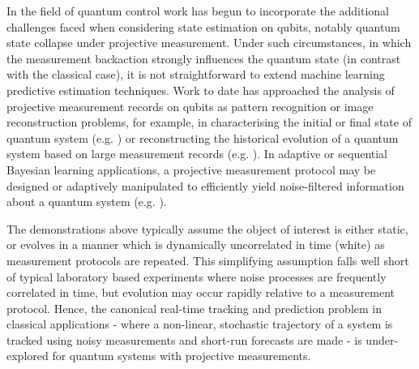 In the field of quantum control work has begun to incorporate the additional challenges faced when considering state estimation on qubits, notably quantum state collapse under projective measurement.  Under such circumstances, in which the measurement backaction strongly influences the quantum state (in contrast with the classical case), it is not straightforward to extend machine learning predictive estimation techniques.  Work to date has approached the analysis of projective measurement records on qubits as pattern recognition or image reconstruction problems, for example, in characterising the initial or final state of quantum system (e.g. \cite{struchalin2016experimental, sergeevich2011characterization, mahler2013adaptive}) or reconstructing the historical evolution of a quantum system based on large measurement records (e.g. \cite{stenberg2016characterization, shabani2011efficient, shen2014reconstructing, de2016estimation, tan2015prediction, huang2017neural}). In adaptive or sequential Bayesian learning applications, a projective measurement protocol may be designed or adaptively manipulated to efficiently yield noise-filtered information about a quantum system (e.g. \cite{bonato2016optimized, wiebe2015bayesian}). 

The demonstrations above typically assume the object of interest is either static, or evolves in a manner which is dynamically uncorrelated in time (white) as measurement protocols are repeated. This simplifying assumption falls well short of typical laboratory based experiments where noise processes are frequently correlated in time, but evolution may occur rapidly relative to a measurement protocol.  Hence, the canonical real-time tracking and prediction problem in classical applications - where a non-linear, stochastic trajectory of a system is tracked using noisy measurements and short-run forecasts are made - is under-explored for quantum systems with projective measurements.


